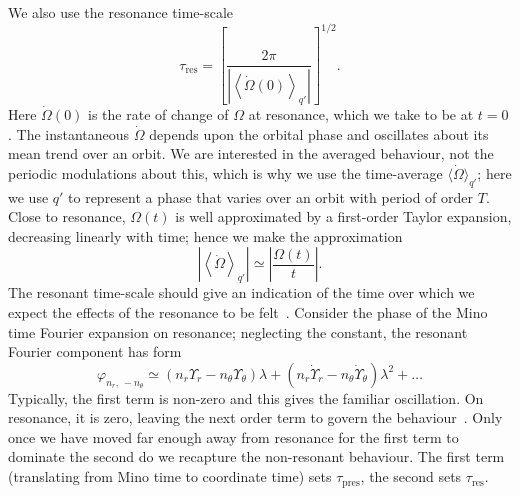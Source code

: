 \documentclass[aps,prd,amsfonts,amssymb,amsmath,nofootinbib,reprint,showpacs,superscriptaddress,twocolumn]{revtex4}
\newcommand{\sub}[1]{\ensuremath{_\text{#1}}}
\begin{document}
We also use the resonance time-scale
\begin{equation}
\tau\sub{res} = \left[\frac{2\pi}{\left|\left\langle\dot{\Omega}(0)\right\rangle_{q'}\right|}\right]^{1/2}.
\label{eq:t-res}
\end{equation}
Here $\dot{\Omega}(0)$ is the rate of change of $\Omega$ at resonance, which we take to be at $t = 0$. The instantaneous $\dot{\Omega}$ depends upon the orbital phase and oscillates about its mean trend over an orbit. We are interested in the averaged behaviour, not the periodic modulations about this, which is why we use the time-average $\langle\dot{\Omega}\rangle_{q'}$; here we use $q'$ to represent a phase that varies over an orbit with period of order $T$. Close to resonance, $\Omega(t)$ is well approximated by a first-order Taylor expansion, decreasing linearly with time; hence we make the approximation
\begin{equation}
\left|\left\langle\dot{\Omega}\right\rangle_{q'}\right| \simeq \left|\frac{\Omega(t)}{t}\right|.
\end{equation}
The resonant time-scale should give an indication of the time over which we expect the effects of the resonance to be felt~\cite{Bosley1992}. Consider the phase of the Mino time Fourier expansion on resonance; neglecting the constant, the resonant Fourier component has form
\begin{equation}
\varphi_{n_r,\,-n_\theta} \simeq \left(n_r\Upsilon_r - n_\theta\Upsilon_\theta\right)\lambda + \left(n_r\dot{\Upsilon}_r - n_\theta\dot{\Upsilon}_\theta\right)\lambda^2 + \ldots
\end{equation}
Typically, the first term is non-zero and this gives the familiar oscillation. On resonance, it is zero, leaving the next order term to govern the behaviour~\cite{Flanagan2012}. Only once we have moved far enough away from resonance for the first term to dominate the second do we recapture the non-resonant behaviour. The first term (translating from Mino time to coordinate time) sets $\tau\sub{pres}$, the second sets $\tau\sub{res}$.
\end{document}
